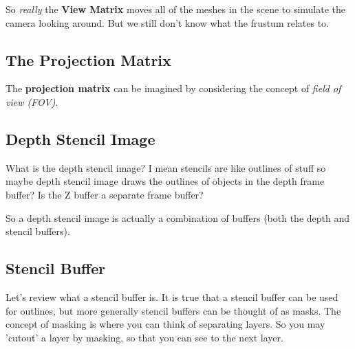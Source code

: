 \documentclass{article}
\begin{document}
\par So \textit{really} the \textbf{View Matrix} moves all of the
meshes in the scene to simulate the camera looking around. But we
still don't know what the frustum relates to.

\subsection*{The Projection
Matrix}
\par The \textbf{projection matrix} can be imagined by considering
the concept of \textit{field of view (FOV)}.

\subsection*{Depth Stencil Image}
\par What is the depth stencil image? I mean stencils are like
outlines of stuff so maybe depth stencil image draws the outlines of
objects in the depth frame buffer? Is the Z buffer a separate frame buffer?

\par So a depth stencil image is actually a combination of buffers
(both the depth and stencil buffers).

\subsection*{Stencil Buffer}
\par Let's review what a stencil buffer is. It is true that a stencil
buffer can be used for outlines, but more generally\textemdash
stencil buffers can be thought of as masks. The concept of masking is
where you can think of separating layers. So you may 'cutout' a layer
by masking, so that you can see to the next layer.
\end{document}
